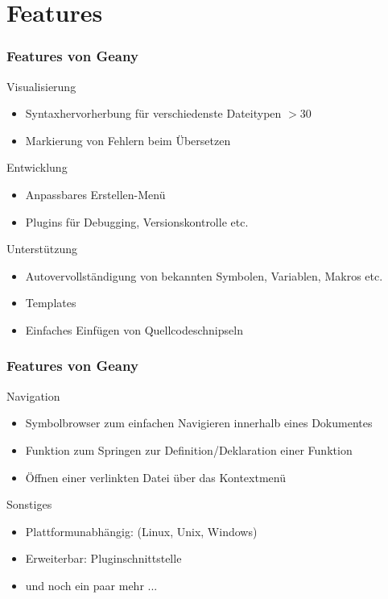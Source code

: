 \section{Features}
\begin{frame}[allowframebreak]
	\frametitle{Features von Geany}
	\begin{block}{Visualisierung}
		\begin{itemize}
			\item Syntaxhervorherbung für verschiedenste Dateitypen $>$30
			\item Markierung von Fehlern beim Übersetzen
		\end{itemize}
	\end{block}
	\begin{block}{Entwicklung}
		\begin{itemize}
			\item Anpassbares Erstellen-Menü
			\item Plugins für Debugging, Versionskontrolle etc.
		\end{itemize}
	\end{block}
	\begin{block}{Unterstützung}
		\begin{itemize}
			\item Autovervollständigung von bekannten Symbolen,
				  Variablen, Makros etc.
			\item Templates
			\item Einfaches Einfügen von Quellcodeschnipseln
		\end{itemize}
	\end{block}
\end{frame}
\begin{frame}[allowframebreak]
	\frametitle{Features von Geany}
	\begin{block}{Navigation}
		\begin{itemize}
			\item Symbolbrowser zum einfachen Navigieren innerhalb
			      eines Dokumentes
			\item Funktion zum Springen zur Definition/Deklaration
			      einer Funktion
			\item Öffnen einer verlinkten Datei über das Kontextmenü
		\end{itemize}
	\end{block}
	\begin{block}{Sonstiges}
		\begin{itemize}
			\item Plattformunabhängig: (Linux, Unix, Windows)
			\item Erweiterbar: Pluginschnittstelle
			\item und noch ein paar mehr ...
		\end{itemize}
	\end{block}
\end{frame}
